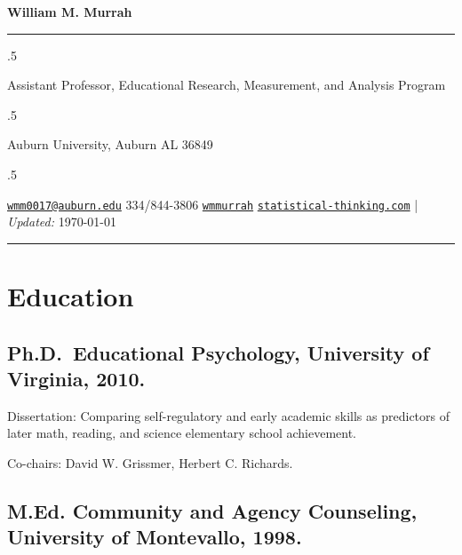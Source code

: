 \documentclass[11pt,]{article}
\renewenvironment{itemize}{
  \begin{list}{}{
    \setlength{\leftmargin}{1.5em}
  }
}{
  \end{list}
}
\begin{document}
\centerline{\huge \bf William M. Murrah}

\vspace{2 mm}

\hrule

\vspace{2 mm}

\moveleft.5\hoffset\centerline{Assistant Professor, Educational Research, Measurement, and Analysis
Program}
\moveleft.5\hoffset\centerline{Auburn University, Auburn AL 36849}
\moveleft.5\hoffset\centerline{ \faEnvelopeO \hspace{1 mm} \href{mailto:}{\tt \href{mailto:wmm0017@auburn.edu}{\nolinkurl{wmm0017@auburn.edu}}} \hspace{1 mm}  \faPhone \hspace{1 mm}  334/844-3806  \hspace{1 mm}  \faGithub \hspace{1 mm} \href{http://github.com/wmmurrah}{\tt wmmurrah} \hspace{1 mm}    \faGlobe \hspace{1 mm} \href{http://statistical-thinking.com}{\tt statistical-thinking.com}    | \emph{Updated:} \today}

\vspace{2 mm}

\hrule


\hypertarget{education}{%
\section{Education}\label{education}}

\hypertarget{ph.d.-educational-psychology-university-of-virginia-2010.}{%
\subsection{Ph.D.~Educational Psychology, University of Virginia,
2010.}\label{ph.d.-educational-psychology-university-of-virginia-2010.}}

\begin{itemize}
\item
  Dissertation: Comparing self-regulatory and early academic skills as
  predictors of later math, reading, and science elementary school
  achievement.
\item
  Co-chairs: David W. Grissmer, Herbert C. Richards.
\end{itemize}

\hypertarget{m.ed.-community-and-agency-counseling-university-of-montevallo-1998.}{%
\subsection{M.Ed. Community and Agency Counseling, University of
Montevallo,
1998.}\label{m.ed.-community-and-agency-counseling-university-of-montevallo-1998.}}
\end{document}
